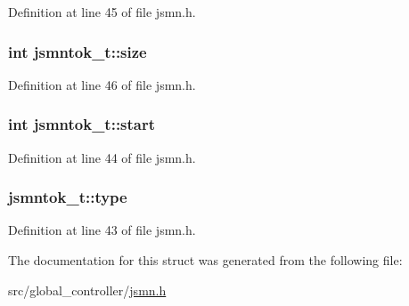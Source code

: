 Definition at line 45 of file jsmn.\-h.

\hypertarget{structjsmntok__t_a8ac3694b7335456c8e602197778883db}{
\subsubsection[{size}]{\setlength{\rightskip}{0pt plus 5cm}int jsmntok\-\_\-t\-::size}}\label{structjsmntok__t_a8ac3694b7335456c8e602197778883db}


Definition at line 46 of file jsmn.\-h.

\hypertarget{structjsmntok__t_a0a8f55d0095f268ce8e224fe1234acd0}{
\subsubsection[{start}]{\setlength{\rightskip}{0pt plus 5cm}int jsmntok\-\_\-t\-::start}}\label{structjsmntok__t_a0a8f55d0095f268ce8e224fe1234acd0}


Definition at line 44 of file jsmn.\-h.

\hypertarget{structjsmntok__t_ac03dbd6b83cbcd979eb64702d5b9943e}{
\subsubsection[{type}]{ jsmntok\-\_\-t\-::type}}\label{structjsmntok__t_ac03dbd6b83cbcd979eb64702d5b9943e}


Definition at line 43 of file jsmn.\-h.



The documentation for this struct was generated from the following file\-:\begin{DoxyCompactItemize}
\item 
src/global\-\_\-controller/\hyperlink{global__controller_2jsmn_8h}{jsmn.\-h}\end{DoxyCompactItemize}
